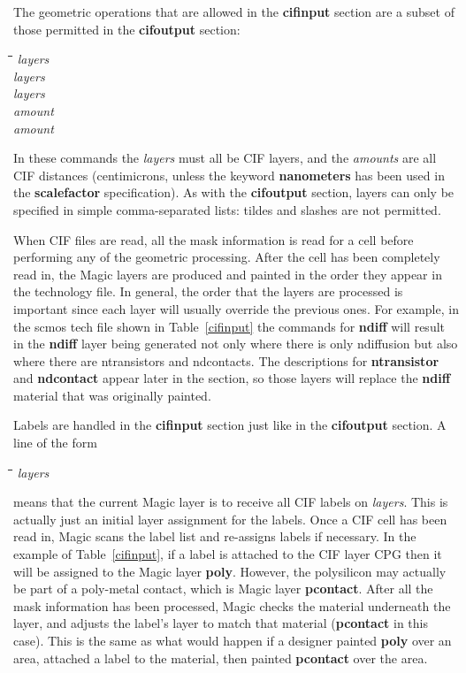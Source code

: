 \documentclass[letterpaper,twoside,12pt]{article}
\def\hinch{\hspace*{0.5in}}
\def\starti{\begin{center}\begin{tabbing}\hinch\=\hinch\=\hinch\=\hinch\=\kill}
\def\endi{\end{tabbing}\end{center}}
\def\ii{\>\>\>}
\begin{document}
The geometric operations that are allowed in the {\bfseries cifinput} section
are a subset of those permitted in the {\bfseries cifoutput} section:

\starti
   \ii {\bfseries or} {\itshape layers} \\
   \ii {\bfseries and} {\itshape layers} \\
   \ii {\bfseries and-not} {\itshape layers} \\
   \ii {\bfseries grow} {\itshape amount} \\
   \ii {\bfseries shrink} {\itshape amount}
\endi

In these commands the {\itshape layers} must all be CIF layers, and the
{\itshape amounts} are all CIF distances (centimicrons, unless the keyword
{\bfseries nanometers} has been used in the {\bfseries scalefactor}
specification).  As with the
{\bfseries cifoutput} section, layers can only be specified in simple
comma-separated lists:  tildes and slashes are not permitted.

When CIF files are read, all the mask information is read for a cell
before performing any of the geometric processing.  After the cell
has been completely read in, the Magic layers are produced and
painted in the order they appear in the technology file.  In
general, the order that the layers are processed is important
since each layer will usually override the previous ones.  For
example, in the scmos tech file shown in Table~\ref{cifinput} the commands
for {\bfseries ndiff} will result in the {\bfseries ndiff} layer being generated
not only where there is only ndiffusion
but also where there are
ntransistors and ndcontacts.
The descriptions
for {\bfseries ntransistor} and {\bfseries ndcontact} appear later in the section,
so those layers will replace the {\bfseries ndiff} material that was originally
painted.

Labels are handled in the {\bfseries cifinput} section just like in the
{\bfseries cifoutput} section.  A line of the form

\starti
   \ii {\bfseries labels} {\itshape layers}
\endi

means that the current Magic layer is to receive all CIF labels
on {\itshape layers}.  This is actually just an initial layer assignment
for the labels.  Once a CIF cell has been read in, Magic scans the
label list and re-assigns labels if necessary.  In the example of
Table~\ref{cifinput}, if a label is attached to the CIF layer CPG then it will
be assigned to the Magic layer {\bfseries poly}.  However, the polysilicon
may actually be part of a poly-metal contact, which is Magic layer
{\bfseries pcontact}.  After all the mask information has been processed, 
Magic checks the material underneath the layer, and adjusts the
label's layer to match that material ({\bfseries pcontact} in this case).
This is the same as what would happen if a designer painted {\bfseries poly}
over an area, attached a label to the material, then painted {\bfseries pcontact}
over the area.
\end{document}
